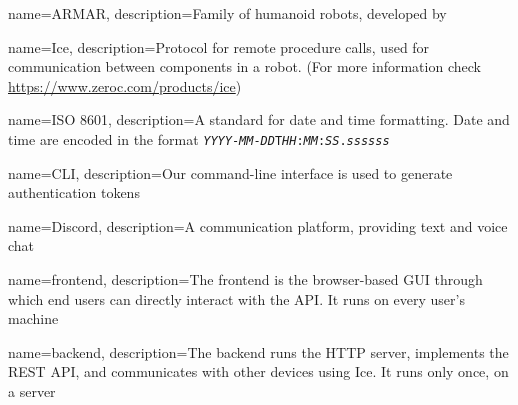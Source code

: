 
{   
    name=ARMAR,
    description={Family of humanoid robots, developed by \hht}
}

{
    name=Ice,
    description={Protocol for remote procedure calls, used for communication between components in a robot. (For more information check \url{https://www.zeroc.com/products/ice})}
}

{
    name={ISO 8601},
    description={A standard for date and time formatting. Date and time are encoded in the format \texttt{\textit{YYYY}-\textit{MM}-\textit{DD}T\textit{HH}:\textit{MM}:\textit{SS}.\textit{ssssss}}}
}

{
    name=CLI,
    description={Our command-line interface is used to generate authentication tokens}
}

{
    name=Discord,
    description={A communication platform, providing text and voice chat}
}

{
    name=frontend,
    description={The frontend is the browser-based GUI through which end users can directly interact with the API. It runs on every user's machine}
}

{
    name=backend,
    description={The backend runs the HTTP server, implements the REST API, and communicates with other devices using Ice. It runs only once, on a server}
}
